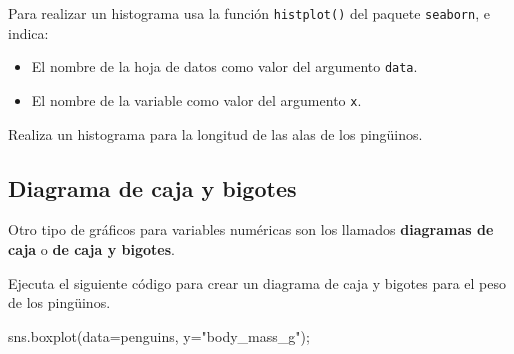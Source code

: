 \documentclass[
  a4paper,
  noprof,
  12pt,
  notoc,
  nosols,
  nobib]{mnye}
\newenvironment{Shaded}{\begin{snugshade}}{\end{snugshade}}
\newcommand{\NormalTok}[1]{\textcolor[rgb]{0.00,0.23,0.31}{#1}}
\newcommand{\OperatorTok}[1]{\textcolor[rgb]{0.37,0.37,0.37}{#1}}
\newcommand{\StringTok}[1]{\textcolor[rgb]{0.13,0.47,0.30}{#1}}
\providecommand{\tightlist}{%
  \setlength{\itemsep}{0pt}\setlength{\parskip}{0pt}}\usepackage{longtable,booktabs,array}
\renewenvironment{exercise}[1][]{
            \if\relax\detokenize{#1}\relax
                \ex
            \else
                \ex[note={#1}]
            \fi
        }{\endex}
\theoremstyle{definition}
\newtheorem{exercise}{Ejercicio}[section]
\theoremstyle{remark}
\begin{document}
\begin{tcolorbox}[enhanced jigsaw, arc=.35mm, colback=white, colframe=quarto-callout-note-color-frame, breakable, opacityback=0, bottomrule=.15mm, rightrule=.15mm, left=2mm, toprule=.15mm, leftrule=.75mm]
\begin{minipage}[t]{5.5mm}
\textcolor{quarto-callout-note-color}{\faInfo}
\end{minipage}%
\begin{minipage}[t]{\textwidth - 5.5mm}

Para realizar un histograma usa la función \texttt{histplot()} del
paquete \texttt{seaborn}, e indica:

\begin{itemize}
\tightlist
\item
  El nombre de la hoja de datos como valor del argumento \texttt{data}.
\item
  El nombre de la variable como valor del argumento \texttt{x}.
\end{itemize}

\end{minipage}%
\end{tcolorbox}

\begin{exercise}[]%
\protect\hypertarget{exr-1numerical-histplot}{}\label{exr-1numerical-histplot}%
Realiza un histograma para la longitud de las alas de los pingüinos.

\end{exercise}

\hypertarget{diagrama-de-caja-y-bigotes}{%
\subsection{Diagrama de caja y
bigotes}\label{diagrama-de-caja-y-bigotes}}

Otro tipo de gráficos para variables numéricas son los llamados
\textbf{diagramas de caja} o \textbf{de caja y bigotes}.

Ejecuta el siguiente código para crear un diagrama de caja y bigotes
para el peso de los pingüinos.

\begin{Shaded}
\begin{Highlighting}[]
\NormalTok{sns.boxplot(data}\OperatorTok{=}\NormalTok{penguins, y}\OperatorTok{=}\StringTok{"body\_mass\_g"}\NormalTok{)}\OperatorTok{;}
\end{Highlighting}
\end{Shaded}
\end{document}
